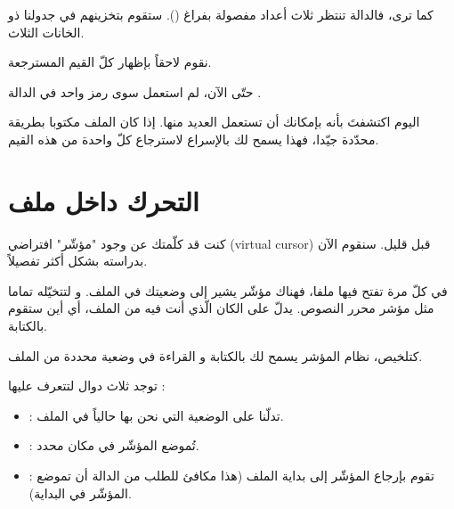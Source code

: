 كما ترى، فالدالة
تنتظر ثلاث أعداد مفصولة بفراغ
().
ستقوم بتخزينهم في جدولنا ذو الخانات الثلاث.

نقوم لاحقاً بإظهار كلّ القيم المسترجعة.

\begin{information}
حتّى الآن، لم استعمل سوى رمز
واحد في الدالة
.

اليوم اكتشفتَ بأنه بإمكانك أن تستعمل العديد منها. إذا كان الملف مكتوبا بطريقة محدّدة جيّدا، فهذا يسمح لك بالإسراع لاسترجاع كلّ واحدة من هذه القيم.
\end{information}

\section{التحرك داخل ملف}
كنت قد كلّمتك عن وجود "مؤشّر" افتراضي
(\textenglish{virtual cursor})
قبل قليل.
سنقوم الآن بدراسته بشكل أكثر تفصيلاً.

في كلّ مرة تفتح فيها ملفا، فهناك مؤشّر يشير إلى وضعيتك في الملف. و لتتخيّله تماما مثل مؤشر محرر النصوص. يدلّ على الكان الّذي أنت فيه من الملف، أي أين ستقوم بالكتابة.

كتلخيص، نظام المؤشر يسمح لك بالكتابة و القراءة في وضعية محددة من الملف.

توجد ثلاث دوال لتتعرف عليها :
\begin{itemize}
  \item {} :
  تدلّنا على الوضعية التي نحن بها حالياً في الملف.
  \item {} :
  تُموضع المؤشّر في مكان محدد.
  \item {} :
  تقوم بإرجاع المؤشّر إلى بداية الملف (هذا مكافئ للطلب من الدالة
  أن تموضع المؤشّر في البداية).
\end{itemize}
